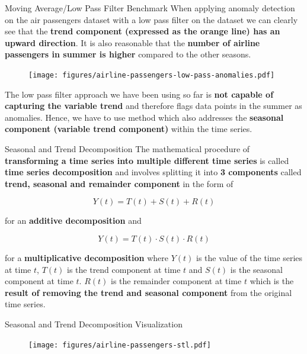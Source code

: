 \documentclass[document.tex]{subfiles}
\begin{document}
    \begin{frame}{Moving Average/Low Pass Filter Benchmark}
        When applying anomaly detection on the air passengers dataset with a low pass filter on the dataset we can clearly see that the \textbf{trend component (expressed as the orange line) has an upward direction}. It is also reasonable that the \textbf{number of airline passengers in summer is higher} compared to the other seasons.
        
        \begin{figure}
            \label{fig:airline-passengers-low-pass}
            \texttt{[image: figures/airline-passengers-low-pass-anomalies.pdf]}
        \end{figure}
        \vspace*{-2mm}
         The low pass filter approach we have been using so far is \textbf{not capable of capturing the variable trend} and therefore flags data points in the summer as anomalies. Hence, we have to use method which also addresses the \textbf{seasonal component (variable trend component)} within the time series.
    \end{frame}

    \begin{frame}{Seasonal and Trend Decomposition}
        The mathematical procedure of \textbf{transforming a time series into multiple different time series} is called \textbf{time series decomposition} and involves splitting it into \textbf{3 components} called \textbf{trend, seasonal and remainder component} in the form of
        
        $$Y(t) = T(t) + S(t) + R(t)$$
        
        for an \textbf{additive decomposition} and
        
        $$Y(t) = T(t) \cdot S(t) \cdot R(t)$$
        
        for a \textbf{multiplicative decomposition} where $Y(t)$ is the value of the time series at time $t$, $T(t)$ is the trend component at time $t$ and $S(t)$ is the seasonal component at time $t$. $R(t)$ is the remainder component at time $t$ which is the \textbf{result of removing the trend and seasonal component} from the original time series.
    \end{frame}

    \begin{frame}{Seasonal and Trend Decomposition Visualization}
        \begin{figure}
            \label{fig:airline-passengers-stl}
            \texttt{[image: figures/airline-passengers-stl.pdf]}
        \end{figure}
    \end{frame}
\end{document}
